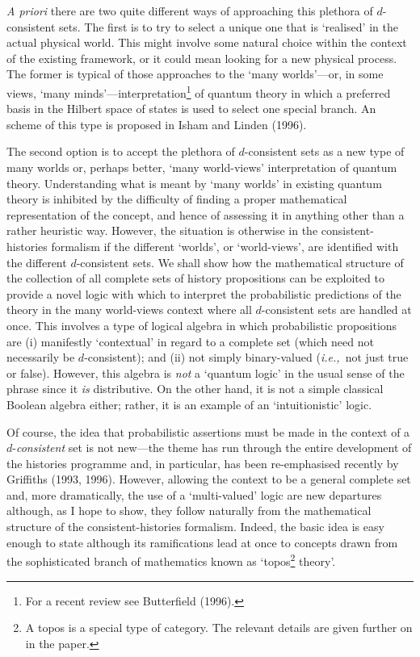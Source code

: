 \documentclass[12pt]{article}
\newcommand{\ie}{{\em i.e.,\ }}
\begin{document}
	{\em A priori\/} there are two quite different ways of
approaching this plethora of $d$-consistent sets. The first is to
try to select a unique one that is `realised' in the actual physical
world.  This might involve some natural choice within the context of
the existing framework, or it could mean looking for a new physical
process. The former is typical of those approaches to the `many
worlds'---or, in some views, `many
minds'---interpretation\footnote{For a recent review see Butterfield
(1996).} of quantum theory in which a preferred basis
in the Hilbert space of states is used to select one special branch.
An scheme of this type is proposed in Isham and Linden (1996).

	The second option is to accept the plethora of $d$-consistent
sets as a new type of many worlds or, perhaps better, `many
world-views' interpretation of quantum theory.  Understanding what
is meant by `many worlds' in existing quantum theory is inhibited by
the difficulty of finding a proper mathematical representation of
the concept, and hence of assessing it in anything other than a
rather heuristic way. However, the situation is otherwise in the
consistent-histories formalism if the different `worlds', or
`world-views', are identified with the different $d$-consistent
sets. We shall show how the mathematical structure of the collection
of all complete sets of history propositions can be exploited to
provide a novel logic with which to interpret the probabilistic
predictions of the theory in the many world-views context where all
$d$-consistent sets are handled at once.  This involves a type of
logical algebra in which probabilistic propositions are (i)
manifestly `contextual' in regard to a complete set (which need not
necessarily be $d$-consistent); and (ii) not simply binary-valued
(\ie not just true or false). However, this algebra is {\em not\/} a
`quantum logic' in the usual sense of the phrase since it {\em is\/}
distributive. On the other hand, it is not a simple classical
Boolean algebra either; rather, it is an example of an
`intuitionistic' logic.

	Of course, the idea that probabilistic assertions must be made
in the context of a $d$-{\em consistent\/} set is not new---the
theme has run through the entire development of the histories
programme and, in particular, has been re-emphasised recently by
Griffiths (1993, 1996).  However, allowing the context to be a
general complete set and, more dramatically, the use of a
`multi-valued' logic are new departures although, as I hope to show,
they follow naturally from the mathematical structure of the
consistent-histories formalism.  Indeed, the basic idea is easy
enough to state although its ramifications lead at once to concepts
drawn from the sophisticated branch of mathematics known as
`topos\footnote{A topos is a special type of category. The relevant
details are given further on in the paper.} theory'.
\end{document}
